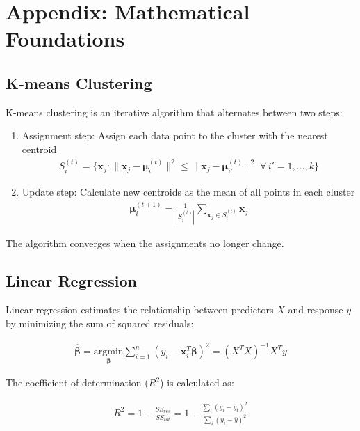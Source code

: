 \documentclass[12pt]{article}
\begin{document}
\section{Appendix: Mathematical Foundations}

\subsection{K-means Clustering}

K-means clustering is an iterative algorithm that alternates between two steps:

\begin{enumerate}
    \item Assignment step: Assign each data point to the cluster with the nearest centroid
    \begin{align}
    S_i^{(t)} = \{\mathbf{x}_j : \|\mathbf{x}_j - \boldsymbol{\mu}_i^{(t)}\|^2 \leq \|\mathbf{x}_j - \boldsymbol{\mu}_{i'}^{(t)}\|^2 \; \forall \, i' = 1,\ldots,k\}
    \end{align}
    
    \item Update step: Calculate new centroids as the mean of all points in each cluster
    \begin{align}
    \boldsymbol{\mu}_i^{(t+1)} = \frac{1}{|S_i^{(t)}|} \sum_{\mathbf{x}_j \in S_i^{(t)}} \mathbf{x}_j
    \end{align}
\end{enumerate}

The algorithm converges when the assignments no longer change.

\subsection{Linear Regression}

Linear regression estimates the relationship between predictors $X$ and response $y$ by minimizing the sum of squared residuals:

\begin{align}
\hat{\boldsymbol{\beta}} = \underset{\boldsymbol{\beta}}{\text{argmin}} \sum_{i=1}^{n} (y_i - \mathbf{x}_i^T \boldsymbol{\beta})^2 = (X^T X)^{-1} X^T y
\end{align}

The coefficient of determination ($R^2$) is calculated as:

\begin{align}
R^2 = 1 - \frac{SS_{res}}{SS_{tot}} = 1 - \frac{\sum_i (y_i - \hat{y}_i)^2}{\sum_i (y_i - \bar{y})^2}
\end{align}
\end{document}
